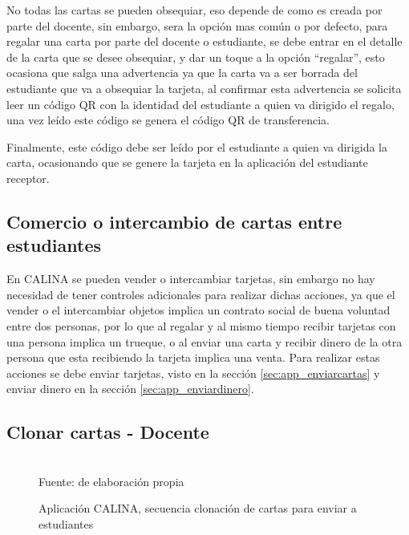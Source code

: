No todas las cartas se pueden obsequiar, eso depende de como es creada por parte del docente, sin embargo,
sera la opción mas común o por defecto, para regalar una carta por parte del docente o estudiante, se debe 
entrar en el detalle de la carta que se desee obsequiar, y dar un toque a la opción ``regalar'', esto ocasiona 
que salga una advertencia ya que la carta va a ser borrada del estudiante que va a obsequiar la tarjeta, al 
confirmar esta advertencia se solicita leer un código QR con la identidad del estudiante a quien va dirigido 
el regalo, una vez leído este código se genera el código QR de transferencia.

Finalmente, este código debe ser leído por el estudiante a quien va dirigida la carta, ocasionando que se 
genere la tarjeta en la aplicación del estudiante receptor.

\subsection{Comercio o intercambio de cartas entre estudiantes}

En CALINA se pueden vender o intercambiar tarjetas, sin embargo no hay necesidad de tener controles 
adicionales para realizar dichas acciones, ya que el vender o el intercambiar objetos implica un contrato 
social de buena voluntad entre dos personas, por lo que al regalar y al mismo tiempo recibir tarjetas con 
una persona implica un trueque, o al enviar una carta y recibir dinero de la otra persona que esta recibiendo 
la tarjeta implica una venta. Para realizar estas acciones se debe enviar tarjetas, visto en la sección 
\ref{sec:app_enviarcartas} y enviar dinero en la sección \ref{sec:app_enviardinero}.

\subsection{Clonar cartas - Docente}

\begin{figure}[!htb]
\caption[]{Aplicación CALINA, secuencia clonación de cartas para enviar a estudiantes}
\centering
\begin{adjustbox}{width=9cm}
\end{adjustbox}
\\
{\footnotesize Fuente: de elaboración propia}
\end{figure}

